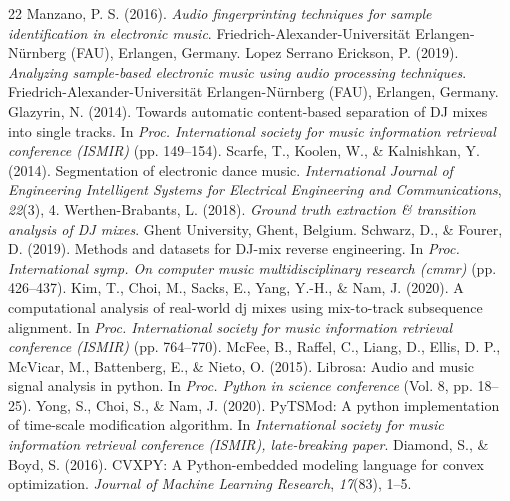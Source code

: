 \documentclass[sigconf]{nimeart}
\begin{document}
\begin{thebibliography}{22}
 {{ }}  Manzano, P. S. (2016). \emph{Audio fingerprinting techniques for sample identification in electronic music}. Friedrich-Alexander-Universität Erlangen-Nürnberg (FAU), Erlangen, Germany.{}
 {{ }}  Lopez Serrano Erickson, P. (2019). \emph{Analyzing sample-based electronic music using audio processing techniques}. Friedrich-Alexander-Universität Erlangen-Nürnberg (FAU), Erlangen, Germany.{}
 {{ }}  Glazyrin, N. (2014). Towards automatic content-based separation of DJ mixes into single tracks. In \emph{Proc. International society for music information retrieval conference (ISMIR)} (pp. 149--154).{}
 {{ }}  Scarfe, T., Koolen, W., \& Kalnishkan, Y. (2014). Segmentation of electronic dance music. \emph{International Journal of Engineering Intelligent Systems for Electrical Engineering and Communications}, \emph{22}(3), 4.{}
 {{ }}  Werthen-Brabants, L. (2018). \emph{Ground truth extraction \& transition analysis of DJ mixes}. Ghent University, Ghent, Belgium.{}
 {{ }}  Schwarz, D., \& Fourer, D. (2019). Methods and datasets for DJ-mix reverse engineering. In \emph{Proc. International symp. On computer music multidisciplinary research (cmmr)} (pp. 426--437).{}
 {{ }}  Kim, T., Choi, M., Sacks, E., Yang, Y.-H., \& Nam, J. (2020). A computational analysis of real-world dj mixes using mix-to-track subsequence alignment. In \emph{Proc. International society for music information retrieval conference (ISMIR)} (pp. 764--770).{}
 {{ }}  McFee, B., Raffel, C., Liang, D., Ellis, D. P., McVicar, M., Battenberg, E., \& Nieto, O. (2015). Librosa: Audio and music signal analysis in python. In \emph{Proc. Python in science conference} (Vol. 8, pp. 18--25).{}
 {{ }}  Yong, S., Choi, S., \& Nam, J. (2020). PyTSMod: A python implementation of time-scale modification algorithm. In \emph{International society for music information retrieval conference (ISMIR), late-breaking paper}.{}
 {{ }}  Diamond, S., \& Boyd, S. (2016). CVXPY: A Python-embedded modeling language for convex optimization. \emph{Journal of Machine Learning Research}, \emph{17}(83), 1--5.{}
\end{thebibliography}
\end{document}
